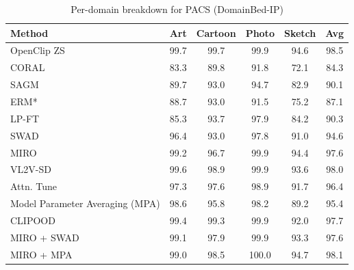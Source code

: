 \documentclass{article} %
\begin{document}
\begin{table}[t]
\small
\centering
\caption{Per-domain breakdown for PACS (DomainBed-IP)}
\begin{tabular}{lccccc}
\toprule
\textbf{Method} & Art & Cartoon & Photo & Sketch & Avg \\ \midrule
OpenClip ZS & 99.7 & 99.7 & 99.9 & 94.6 & 98.5 \\
\midrule
CORAL & 83.3 & 89.8 & 91.8 & 72.1 & 84.3 \\ 
SAGM & 89.7 & 93.0 & 94.7 & 82.9 & 90.1 \\ 
ERM* & 88.7 & 93.0 & 91.5 & 75.2 & 87.1 \\ 
LP-FT & 85.3 & 93.7 & 97.9 & 84.2 & 90.3 \\ 
SWAD & 96.4 & 93.0 & 97.8 & 91.0 & 94.6 \\ 
MIRO & 99.2 & 96.7 & 99.9 & 94.4 & 97.6 \\ 
VL2V-SD & 99.6 & 98.9 & 99.9 & 93.6 & 98.0 \\ 
Attn. Tune & 97.3 & 97.6 & 98.9 & 91.7 & 96.4 \\ 
Model Parameter Averaging (MPA) & 98.6 & 95.8 & 98.2 & 89.2 & 95.4 \\ 
CLIPOOD & 99.4  & 99.3 & 99.9   &92.0 &  97.7\\\hline
MIRO + SWAD & 99.1 & 97.9 & 99.9 & 93.3 & 97.6 \\ 
MIRO + MPA & 99.0 & 98.5 & 100.0 & 94.7 & 98.1 \\ 
\bottomrule
\end{tabular}
\label{table:PACS IP}
\end{table}
\end{document}
